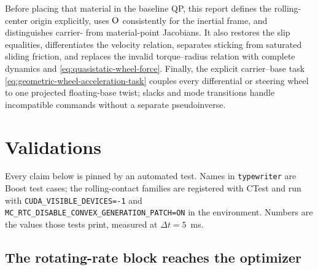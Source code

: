 \documentclass[10pt]{article}
\begin{document}
Before placing that material in the baseline QP, this report defines the
rolling-center origin explicitly, uses $\text{O}$ consistently for the
inertial frame, and distinguishes carrier- from material-point Jacobians. It
also restores the slip equalities, differentiates the velocity relation,
separates sticking from saturated sliding friction, and replaces the invalid
torque--radius relation with complete dynamics and
\eqref{eq:quasistatic-wheel-force}. Finally, the explicit carrier--base task
\eqref{eq:geometric-wheel-acceleration-task} couples every differential or
steering wheel to one projected floating-base twist; slacks and mode
transitions handle incompatible commands without a separate pseudoinverse.


\section{Validations}
\label{sec:validation}

Every claim below is pinned by an automated test. Names in \texttt{typewriter}
are Boost test cases; the rolling-contact families are registered with CTest and
run with \texttt{CUDA\_VISIBLE\_DEVICES=-1} and
\texttt{MC\_RTC\_DISABLE\_CONVEX\_GENERATION\_PATCH=ON} in the environment.
Numbers are the values those tests print, measured at $\Delta t = 5$~ms.

\subsection{The rotating-rate block reaches the optimizer}
\label{sec:validation-rate-rows}
\end{document}
